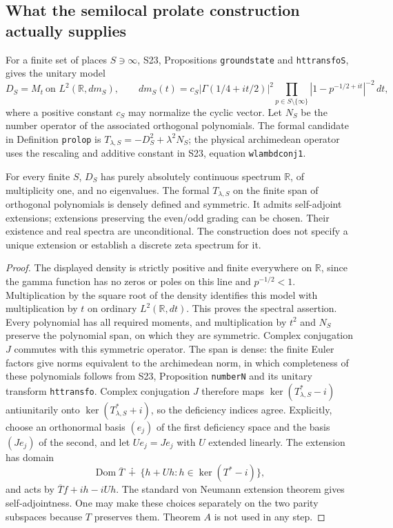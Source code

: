 \subsection{What the semilocal prolate construction actually supplies}

For a finite set of places \(S\ni\infty\), S23,
Propositions \texttt{groundstate} and \texttt{httransfoS}, gives the
unitary model
\[
 D_S=M_t\ \text{on }L^2(\mathbb R,dm_S),\qquad
 dm_S(t)=c_S\left|\Gamma(1/4+it/2)\right|^2
       \prod_{p\in S\setminus\{\infty\}}
          |1-p^{-1/2+it}|^{-2}\,dt,
\]
where a positive constant \(c_S\) may normalize the cyclic vector.
Let \(N_S\) be the number operator of the associated orthogonal
polynomials.  The formal candidate in Definition \texttt{prolop} is
\(T_{\lambda,S}=-D_S^2+\lambda^2N_S\); the physical archimedean
operator uses the rescaling and additive constant in S23, equation
\texttt{wlambdconj1}.

\begin{proposition}
\label{AC-S09}
For every finite \(S\), \(D_S\) has purely absolutely continuous
spectrum \(\mathbb R\), of multiplicity one, and no eigenvalues.
The formal \(T_{\lambda,S}\) on the finite span of orthogonal
polynomials is densely defined and symmetric.  It admits self-adjoint
extensions; extensions preserving the even/odd grading can be chosen.
Their existence and real spectra are unconditional.  The construction
does not specify a unique extension or establish a discrete zeta
spectrum for it.
\end{proposition}
\begin{proof}
The displayed density is strictly positive and finite everywhere on
\(\mathbb R\), since the gamma function has no zeros or poles on
this line and \(p^{-1/2}<1\).  Multiplication by the square root of
the density identifies this model with multiplication by \(t\) on
ordinary \(L^2(\mathbb R,dt)\).  This proves the spectral assertion.
Every polynomial has all required moments, and multiplication by
\(t^2\) and \(N_S\) preserve the polynomial span, on which they
are symmetric.  Complex conjugation \(J\) commutes with this
 symmetric operator.  The span is dense: the finite Euler factors
give norms equivalent to the archimedean norm, in which completeness
of these polynomials follows from S23, Proposition \texttt{numberN}
and its unitary transform \texttt{httransfo}.
Complex conjugation \(J\) therefore maps
\(\ker(T_{\lambda,S}^*-i)\) antiunitarily onto
\(\ker(T_{\lambda,S}^*+i)\), so the deficiency indices agree.
Explicitly, choose an orthonormal basis \((e_j)\) of the first
deficiency space and the basis \((Je_j)\) of the second, and let
\(Ue_j=Je_j\) with \(U\) extended linearly.  The extension has
domain
\[
 \operatorname{Dom}\overline T\ \dotplus\
 \{h+Uh:h\in\ker(T^*-i)\},
\]
and acts by \(\overline T f+ih-iUh\).  The standard von Neumann
extension theorem gives self-adjointness.  One may make these choices
separately on the two parity subspaces because \(T\) preserves them.
Theorem \(A\) is not used in any step.
\end{proof}

